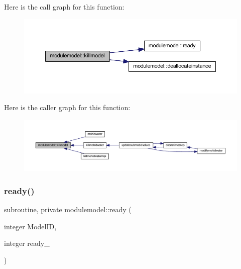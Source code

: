 Here is the call graph for this function\+:\nopagebreak
\begin{figure}[H]
\begin{center}
\leavevmode
\includegraphics[width=350pt]{namespacemodulemodel_a23647852257627fb606f6868bc295162_cgraph}
\end{center}
\end{figure}
Here is the caller graph for this function\+:\nopagebreak
\begin{figure}[H]
\begin{center}
\leavevmode
\includegraphics[width=350pt]{namespacemodulemodel_a23647852257627fb606f6868bc295162_icgraph}
\end{center}
\end{figure}
\mbox{\label{namespacemodulemodel_af5d93bbd065add89f5cd52475a40e7fc}} 
\subsubsection{\texorpdfstring{ready()}{ready()}}
{\footnotesize\ttfamily subroutine, private modulemodel\+::ready (\begin{DoxyParamCaption}\item[{integer}]{Model\+ID,  }\item[{integer}]{ready\+\_\+ }\end{DoxyParamCaption})\hspace{0.3cm}{\ttfamily [private]}}

